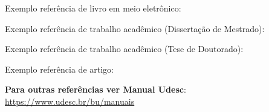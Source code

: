 \noindent Exemplo referência de livro em meio eletrônico: \cite{exemplo_livroe}

\noindent Exemplo referência de trabalho acadêmico (Dissertação de Mestrado): \cite{exemplo_dissertacao}

\noindent Exemplo referência de trabalho acadêmico (Tese de Doutorado): \cite{exemplo_tese}

\noindent Exemplo referência de artigo: \cite{exemplo_artigo}

\noindent \textbf{Para outras referências ver Manual Udesc}: \url{https://www.udesc.br/bu/manuais}








